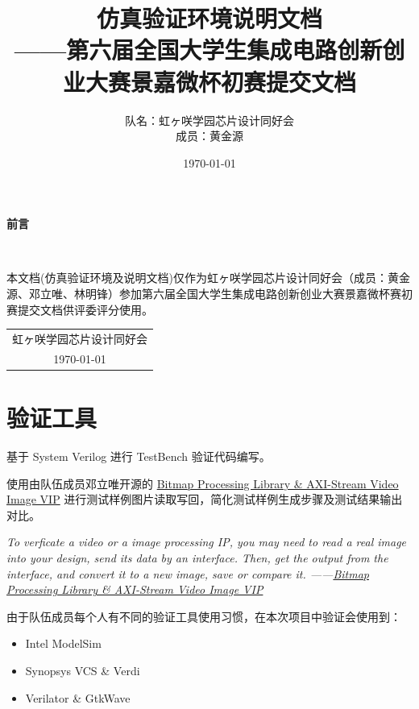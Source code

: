 \documentclass[12pt, a4paper, oneside]{ctexbook}
\title{{\Huge{\textbf{仿真验证环境说明文档}}}\normalsize{\\——第六届全国大学生集成电路创新创业大赛景嘉微杯初赛提交文档}}
\author{队名：虹ヶ咲学园芯片设计同好会\\ 成员：黄金源\space邓立唯\space林明锋}
\date{\today}
\begin{document}
	
	\maketitle	
	\setcounter{page}{1}
	\begin{center}
		\Huge\textbf{前言}
	\end{center}~\
	
	本文档(仿真验证环境及说明文档)仅作为虹ヶ咲学园芯片设计同好会（成员：黄金源、邓立唯、林明锋）参加第六届全国大学生集成电路创新创业大赛景嘉微杯赛初赛提交文档供评委评分使用。
	~\\
	\begin{flushright}
		\begin{tabular}{c}
			虹ヶ咲学园芯片设计同好会\\
			\today
		\end{tabular}
	\end{flushright}
	\newpage
	\setcounter{page}{1}
	\tableofcontents
	\newpage
	\setcounter{page}{1}
	
	\chapter{验证工具}
	基于 System Verilog 进行 TestBench 验证代码编写。\par 使用由队伍成员邓立唯开源的 \href{https://github.com/Aperture-Electronic/SystemVerilog-Bitmap-Library-AXI-Image-VIP}{Bitmap Processing Library \& AXI-Stream Video Image VIP} 进行测试样例图片读取写回，简化测试样例生成步骤及测试结果输出对比。\par \par
	\emph{To verficate a video or a image processing IP, you may need to read a real image into your design, send its data by an interface. Then, get the output from the interface, and convert it to a new image, save or compare it. ——\href{https://github.com/Aperture-Electronic/SystemVerilog-Bitmap-Library-AXI-Image-VIP}{Bitmap Processing Library \& AXI-Stream Video Image VIP}}
	\par \par 由于队伍成员每个人有不同的验证工具使用习惯，在本次项目中验证会使用到：
	\begin{itemize}
		\item Intel ModelSim
		\item Synopsys VCS \& Verdi
		\item Verilator \& GtkWave
	\end{itemize}
\end{document}
